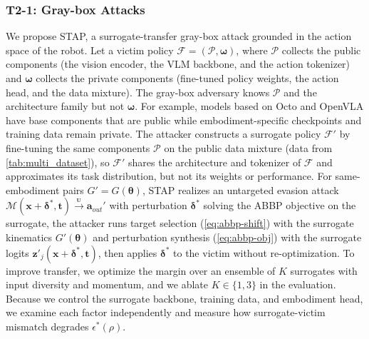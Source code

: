 \documentclass[11pt,letterpaper]{article}
\begin{document}
\subsubsection{T2-1: Gray-box Attacks}\label{sec:t2_1}

 We propose STAP, a surrogate-transfer gray-box attack grounded in the action space of the robot. Let a victim policy  $\mathcal{F}=(\mathcal{P},\bm{\omega})$, where $\mathcal{P}$ collects the public components (\eg the vision encoder, the VLM backbone, and the action tokenizer) and $\bm{\omega}$ collects the private components (\eg fine-tuned policy weights, the action head, and the data mixture). The gray-box adversary knows $\mathcal{P}$ and the architecture family but not $\bm{\omega}$. 
For example, models based on Octo and OpenVLA have base components that are public while embodiment-specific checkpoints and training data remain private. 
The attacker constructs a surrogate policy $\mathcal{F}'$ by fine-tuning the same components $\mathcal{P}$ on the public data mixture (\eg data from \autoref{tab:multi_dataset}), %
so $\mathcal{F}'$ shares the architecture and tokenizer of $\mathcal{F}$ and approximates its task distribution, but not its weights or performance. 
For same-embodiment pairs $G'=G(\bm{\theta})$, STAP realizes an untargeted evasion attack $\mathcal{M}(\bm{x}+\bm{\delta}^{*},\bm{t})\xrightarrow{{}_{\textbf{U}}}\bm{a}_{out}'$ with  perturbation $\bm{\delta}^{*}$ solving the ABBP objective on the surrogate, \ie the attacker runs target selection (\autoref{eq:abbp-shift}) with the surrogate kinematics $G'(\bm{\theta})$ and perturbation synthesis (\autoref{eq:abbp-obj}) with the surrogate logits $\bm{z}'_j(\bm{x}+\bm{\delta}^{*},\bm{t})$, then applies $\bm{\delta}^{*}$ to the victim without re-optimization. 
To improve transfer, we optimize the margin over an ensemble of $K$ surrogates with input diversity and momentum, and we ablate $K\in\{1,3\}$ in the evaluation. Because we control the surrogate backbone, training data, and embodiment head, we examine each factor independently and measure how surrogate-victim mismatch degrades $\epsilon^{*}(\rho)$. %
\end{document}
